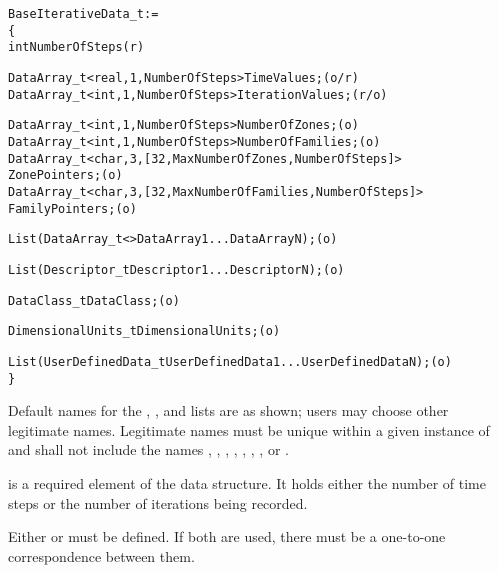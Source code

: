\begin{alltt}
  BaseIterativeData\_t :=
    \{
    int NumberOfSteps                                                       (r)

    DataArray\_t<real, 1, NumberOfSteps> TimeValues ;                        (o/r)
    DataArray\_t<int,  1, NumberOfSteps> IterationValues ;                   (r/o)

    DataArray\_t<int,  1, NumberOfSteps> NumberOfZones ;                     (o)
    DataArray\_t<int,  1, NumberOfSteps> NumberOfFamilies ;                  (o)
    DataArray\_t<char, 3, [32, MaxNumberOfZones, NumberOfSteps]>
       ZonePointers ;                                                       (o)
    DataArray\_t<char, 3, [32, MaxNumberOfFamilies, NumberOfSteps]>
       FamilyPointers ;                                                     (o)

    List( DataArray\_t<> DataArray1 ... DataArrayN ) ;                       (o)

    List( Descriptor\_t Descriptor1 ... DescriptorN ) ;                      (o)

    DataClass\_t DataClass ;                                                 (o)

    DimensionalUnits\_t DimensionalUnits ;                                   (o)

    List( UserDefinedData\_t UserDefinedData1 ... UserDefinedDataN ) ;       (o)
    \}
\end{alltt}

\begin{notes}
\item Default names for the , , and
      lists are as shown; users may choose other legitimate names.
      Legitimate names must be unique within a given instance
      of  and shall not include the names
      , , ,
      , ,
      , , or .
\item {} is a required element of the
       data structure.
      It holds either the number of time steps or the number of iterations
      being recorded.
\item Either  or  must be defined.
      If both are used, there must be a one-to-one correspondence between
      them.
\end{notes}

